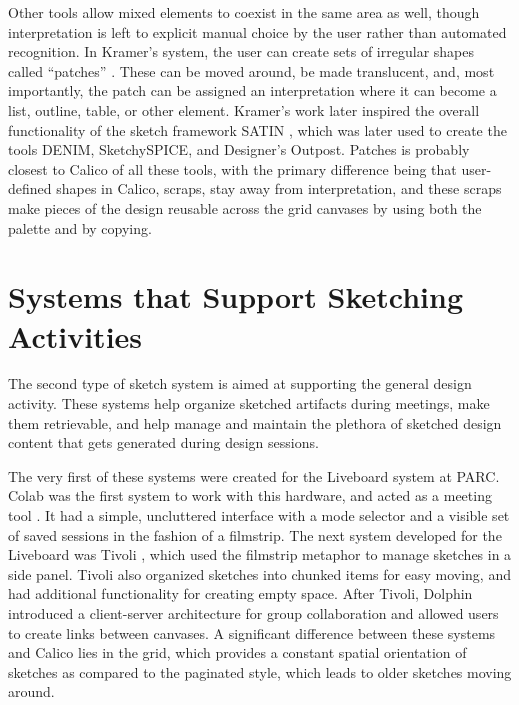 \documentclass[12pt,fleqn]{ucithesis}
\begin{document}
Other tools allow mixed elements to coexist in the same area as well, though interpretation is left to explicit manual choice by the user rather than automated recognition. In Kramer's system, the user can create sets of irregular shapes called ``patches'' \citep{Kramer}. These can be moved around, be made translucent, and, most importantly, the patch can be assigned an interpretation where it can become a list, outline, table, or other element. Kramer's work later inspired the overall functionality of the sketch framework SATIN \citep{Hong}, which was later used to create the tools DENIM, SketchySPICE, and Designer's Outpost.  Patches is probably closest to Calico of all these tools, with the primary difference being that user-defined shapes in Calico, scraps, stay away from interpretation, and these scraps make pieces of the design reusable across the grid canvases by using both the palette and by copying.

\section{Systems that Support Sketching Activities}
\label{relatedwork:2}

The second type of sketch system is aimed at supporting the general design activity. These systems help organize sketched artifacts during meetings, make them retrievable, and help manage and maintain the plethora of sketched design content that gets generated during design sessions. 

The very first of these systems were created for the Liveboard system at PARC. Colab was the first system to work with this hardware, and acted as a meeting tool \citep{Stefik}. It had a simple, uncluttered interface with a mode selector and a visible set of saved sessions in the fashion of a filmstrip. The next system developed for the Liveboard was Tivoli \citep{Pederson}, which used the filmstrip metaphor to manage sketches in a side panel. Tivoli also organized sketches into chunked items for easy moving, and had additional functionality for creating empty space. After Tivoli, Dolphin \citep{Streitz:1994:DIM:192844.193044} introduced a client-server architecture for group collaboration and allowed users to create links between canvases. A significant difference between these systems and Calico lies in the grid, which provides a constant spatial orientation of sketches as compared to the paginated style, which leads to older sketches moving around. 
\end{document}
